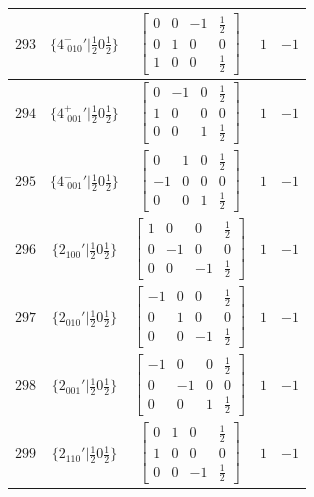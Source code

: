 \documentclass[fleqn,8pt]{jsarticle}
\begin{document}
\begin{longtable}{ccccc}
$ 293 $ & $ \{4^{-}_{\,\,010}{}'|\frac{1}{2} 0 \frac{1}{2}\} $ & $ \begin{bmatrix} 0 & 0 & -1 & \frac{1}{2} \\ 0 & 1 & 0 & 0 \\ 1 & 0 & 0 & \frac{1}{2} \end{bmatrix} $ & $ 1 $ & $ -1 $ \\ \hline
$ 294 $ & $ \{4^{+}_{\,\,001}{}'|\frac{1}{2} 0 \frac{1}{2}\} $ & $ \begin{bmatrix} 0 & -1 & 0 & \frac{1}{2} \\ 1 & 0 & 0 & 0 \\ 0 & 0 & 1 & \frac{1}{2} \end{bmatrix} $ & $ 1 $ & $ -1 $ \\ \hline
$ 295 $ & $ \{4^{-}_{\,\,001}{}'|\frac{1}{2} 0 \frac{1}{2}\} $ & $ \begin{bmatrix} 0 & 1 & 0 & \frac{1}{2} \\ -1 & 0 & 0 & 0 \\ 0 & 0 & 1 & \frac{1}{2} \end{bmatrix} $ & $ 1 $ & $ -1 $ \\ \hline
$ 296 $ & $ \{2{}_{100}{}'|\frac{1}{2} 0 \frac{1}{2}\} $ & $ \begin{bmatrix} 1 & 0 & 0 & \frac{1}{2} \\ 0 & -1 & 0 & 0 \\ 0 & 0 & -1 & \frac{1}{2} \end{bmatrix} $ & $ 1 $ & $ -1 $ \\ \hline
$ 297 $ & $ \{2{}_{010}{}'|\frac{1}{2} 0 \frac{1}{2}\} $ & $ \begin{bmatrix} -1 & 0 & 0 & \frac{1}{2} \\ 0 & 1 & 0 & 0 \\ 0 & 0 & -1 & \frac{1}{2} \end{bmatrix} $ & $ 1 $ & $ -1 $ \\ \hline
$ 298 $ & $ \{2{}_{001}{}'|\frac{1}{2} 0 \frac{1}{2}\} $ & $ \begin{bmatrix} -1 & 0 & 0 & \frac{1}{2} \\ 0 & -1 & 0 & 0 \\ 0 & 0 & 1 & \frac{1}{2} \end{bmatrix} $ & $ 1 $ & $ -1 $ \\ \hline
$ 299 $ & $ \{2{}_{110}{}'|\frac{1}{2} 0 \frac{1}{2}\} $ & $ \begin{bmatrix} 0 & 1 & 0 & \frac{1}{2} \\ 1 & 0 & 0 & 0 \\ 0 & 0 & -1 & \frac{1}{2} \end{bmatrix} $ & $ 1 $ & $ -1 $ \\ \hline

\end{longtable}
\end{document}
